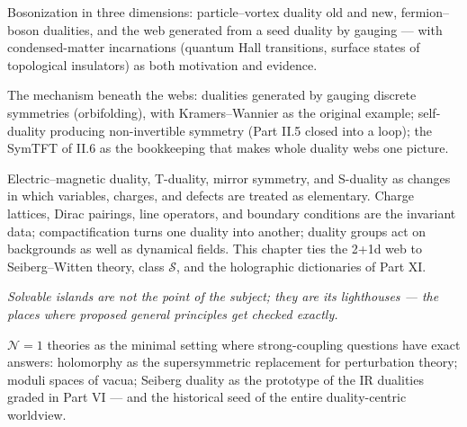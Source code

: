Bosonization in three dimensions: particle--vortex duality old and new, fermion--boson dualities, and the web generated from a seed duality by gauging --- with condensed-matter incarnations (quantum Hall transitions, surface states of topological insulators) as both motivation and evidence.

The mechanism beneath the webs: dualities generated by gauging discrete symmetries (orbifolding), with Kramers--Wannier as the original example; self-duality producing non-invertible symmetry (Part II.5 closed into a loop); the SymTFT of II.6 as the bookkeeping that makes whole duality webs one picture.

Electric--magnetic duality, T-duality, mirror symmetry, and S-duality as changes in which variables, charges, and defects are treated as elementary. Charge lattices, Dirac pairings, line operators, and boundary conditions are the invariant data; compactification turns one duality into another; duality groups act on backgrounds as well as dynamical fields. This chapter ties the 2+1d web to Seiberg--Witten theory, class $\mathcal{S}$, and the holographic dictionaries of Part XI.


\noin \emph{Solvable islands are not the point of the subject; they are its lighthouses --- the places where proposed general principles get checked exactly.}

$\mathcal{N}=1$ theories as the minimal setting where strong-coupling questions have exact answers: holomorphy as the supersymmetric replacement for perturbation theory; moduli spaces of vacua; Seiberg duality as the prototype of the IR dualities graded in Part VI --- and the historical seed of the entire duality-centric worldview.

